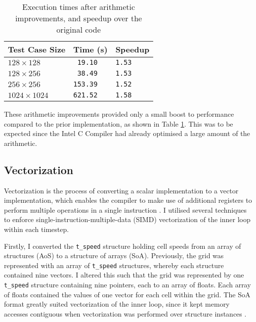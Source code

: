 \documentclass[11pt, twocolumn, a4paper]{article}
\begin{document}
\begin{table}[htbp]
  \begin{center}
  \caption{Execution times after arithmetic improvements, and speedup over the original code}\label{tab:arithmetic_improvements}
  \begin{tabular}{l | l l} 
      \hline\hline
      Test Case Size&Time (s)&Speedup\\
      \hline
      $128 \times 128$&\texttt{ 19.10}&\texttt{1.53}\\
      $128 \times 256$&\texttt{ 38.49}&\texttt{1.53}\\
      $256 \times 256$&\texttt{153.39}&\texttt{1.52}\\
      $1024 \times 1024$&\texttt{621.52}&\texttt{1.58}\\
      \hline
    \end{tabular}
  \end{center}
\end{table}

These arithmetic improvements provided only a small boost to performance compared to the prior implementation, as shown in Table \ref{tab:arithmetic_improvements}.
This was to be expected since the Intel C Compiler had already optimised a large amount of the arithmetic.

\subsection{Vectorization}

Vectorization is the process of converting a scalar implementation to a vector implementation, which enables the compiler to make use of additional registers to perform multiple operations in a single instruction \cite{vectorization}.
I utilised several techniques to enforce single-instruction-multiple-data (SIMD) vectorization of the inner loop within each timestep.

Firstly, I converted the \texttt{t\_speed} structure holding cell speeds from an array of structures (AoS) to a structure of arrays (SoA).
Previously, the grid was represented with an array of \texttt{t\_speed} structures, whereby each structure contained nine vectors.
I altered this such that the grid was represented by one \texttt{t\_speed} structure containing nine pointers, each to an array of floats.
Each array of floats contained the values of one vector for each cell within the grid.
The SoA format greatly suited vectorization of the inner loop, since it kept memory accesses contiguous when vectorization was performed over structure instances \cite{soa}.
\end{document}
